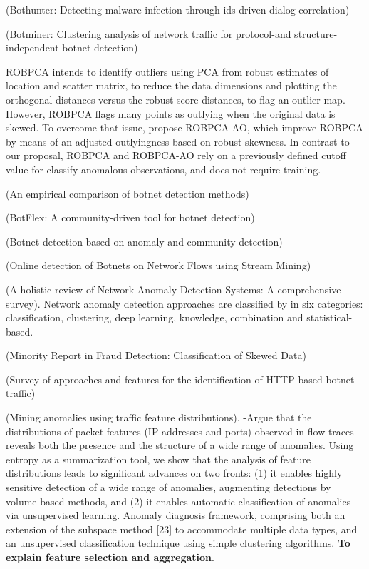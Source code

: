 \documentclass[review]{elsarticle}
\begin{document}
\cite{gu2007bothunter} (Bothunter: Detecting malware infection through ids-driven dialog correlation)

\cite{gu2008botminer} (Botminer: Clustering analysis of network traffic for protocol-and structure-independent botnet detection)

ROBPCA \cite{hubert2005robpca} intends to identify outliers using PCA from robust estimates of location and scatter matrix, to reduce the data dimensions and plotting the orthogonal distances versus the robust score distances, to flag an outlier map. However, ROBPCA flags many points as outlying when the original data is skewed. To overcome that issue, \cite{hubert2009robustskewed} propose ROBPCA-AO, which improve ROBPCA by means of an adjusted outlyingness based on robust skewness. In contrast to our proposal, ROBPCA and ROBPCA-AO rely on a previously defined cutoff value for classify anomalous observations, and does not require training.

\cite{garcia2014empirical} (An empirical comparison of botnet detection methods)

\cite{khattak2015botflex} (BotFlex: A community-driven tool for botnet detection)

\cite{wang2017botnet} (Botnet detection based on anomaly and community detection)

\cite{da2018online} (Online detection of Botnets on Network Flows using Stream Mining)

\cite{moustafa2019holistic} (A holistic review of Network Anomaly Detection Systems: A comprehensive survey). Network anomaly detection approaches are classified by \cite{moustafa2019holistic} in six categories: classification, clustering, deep learning, knowledge, combination and statistical-based.

\cite{Phua2004minority} (Minority Report in Fraud Detection: Classification of Skewed Data)

\cite{acarali2016survey} (Survey of approaches and features for the identification of HTTP-based botnet traffic)

\cite{lakhina2005mining} (Mining anomalies using traffic feature distributions).  -Argue that the distributions of packet features (IP addresses and ports) observed in flow traces reveals both the presence and the structure of a wide range of anomalies. Using entropy as a summarization tool, we show that the analysis of feature distributions leads to significant advances on two fronts: (1) it enables highly sensitive detection of a wide range of anomalies, augmenting detections by volume-based methods, and (2) it enables automatic classification of anomalies via unsupervised learning. Anomaly diagnosis framework, comprising both an extension of the subspace method [23] to accommodate multiple data types, and an unsupervised classification technique using simple clustering algorithms. \textbf{To explain feature selection and aggregation}.
\end{document}
